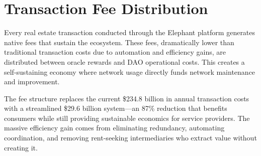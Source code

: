 \section{Transaction Fee Distribution}

Every real estate transaction conducted through the Elephant platform generates native fees that sustain the ecosystem. These fees, dramatically lower than traditional transaction costs due to automation and efficiency gains, are distributed between oracle rewards and DAO operational costs. This creates a self-sustaining economy where network usage directly funds network maintenance and improvement.

The fee structure replaces the current \$234.8 billion in annual transaction costs with a streamlined \$29.6 billion system—an 87\% reduction that benefits consumers while still providing sustainable economics for service providers. The massive efficiency gain comes from eliminating redundancy, automating coordination, and removing rent-seeking intermediaries who extract value without creating it.

